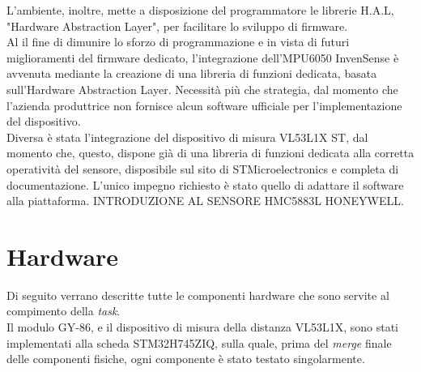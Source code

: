 \documentclass[11pt]{report}
\begin{document}
L'ambiente, inoltre, mette a disposizione del programmatore le librerie H.A.L, "Hardware Abstraction Layer", per facilitare lo sviluppo di firmware.\\
Al il fine di dimunire lo sforzo di programmazione e in vista di futuri miglioramenti del firmware dedicato, l'integrazione dell'MPU6050 InvenSense è avvenuta mediante la creazione di una libreria di funzioni dedicata, basata sull'Hardware Abstraction Layer. Necessità più che strategia, dal momento che l'azienda produttrice non fornisce alcun software ufficiale per l'implementazione del dispositivo.\\
Diversa è stata l'integrazione del dispositivo di misura VL53L1X ST, dal momento che, questo, dispone già di una libreria di funzioni dedicata alla corretta operatività del sensore, disposibile sul sito di STMicroelectronics e completa di documentazione. 
L'unico impegno richiesto è stato quello di adattare il software alla piattaforma.
INTRODUZIONE AL SENSORE HMC5883L HONEYWELL.
\newpage
\chapter{Hardware}
\label{Hardware}
Di seguito verrano descritte tutte le componenti hardware che sono servite al compimento della \textit{task}.\\
Il modulo GY-86, e il dispositivo di misura della distanza VL53L1X, sono stati implementati alla scheda STM32H745ZIQ, sulla quale, prima del \textit{merge} finale delle componenti fisiche, ogni componente è stato testato singolarmente.
\end{document}
